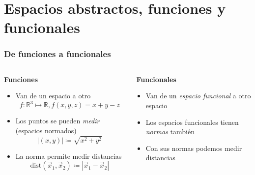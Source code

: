 \documentclass[12pt,aspectratio=169,xcolor=dvipsnames]{beamer}
\begin{document}
\section{Espacios abstractos, funciones y funcionales}
\begin{frame}\frametitle{De funciones a funcionales}

    \begin{columns}[t]
        \begin{column}[t]{0.49\textwidth}
        {\bf Funciones}
        
            \begin{itemize}
                \item<+-> Van de un espacio a otro
                    $$ f: \mathbb R^3 \mapsto \mathbb R, f(x,y,z) = x+y-z $$
                \item<+-> Los puntos se pueden \emph{medir} (espacios normados)
                    $$ |(x,y)| \coloneqq \sqrt{x^2+y^2} $$
                \item<+-> La norma permite medir distancias
                    $$ \text{dist}( \vec x_1, \vec x_2) \coloneqq |\vec x_1 - \vec x_2| $$
            \end{itemize}
        
        \end{column}

        \vline 
        \begin{column}[t]{0.49\textwidth}
        \,\,{\bf Funcionales}

            \begin{itemize}
                \item<+-> Van de un \emph{espacio funcional} a otro espacio
                \item<+-> Los espacios funcionales tienen \emph{normas} también 
                \item<+-> Con sus normas podemos medir distancias
            \end{itemize}
        \end{column}
    \end{columns}
\end{frame}
\end{document}
